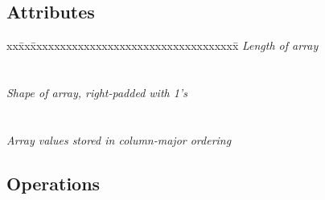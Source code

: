 \subsection{Attributes}

\begin{tabbing}
xx\=xx\=xxxxxxxxxxxxxxxxxxxxxxxxxxxxxxxxxxx\= \kill
\> \todo \>  \textit{Length of array} \\
\>       \>       \\ \\
\> \todo \>  \textit {Shape of array, right-padded with 1's} \\
\>       \>   \\ \\
\> \todo \>  \textit {Array values stored in column-major ordering}\\
\>       \> 
\end{tabbing}

\subsection{Operations}

